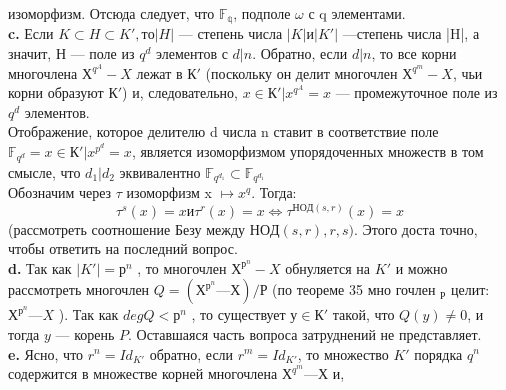 изоморфизм. Отсюда следует, что $\mathbb{F_q}$, подполе $\omega$ с q элементами.\\
\hspace*{15pt}\textbf{c.} Если $K \subset H \subset K', то |H|$ --- степень числа $|K| и |K'|$ ---степень\linebreak
числа |H|, а значит, Н — поле из $q^{d}$ элементов с $d | n$. Обратно, если\linebreak
$d | n$, то все корни многочлена $Х^{q^{A}} - X$ лежат в $К'$ (поскольку он\linebreak
делит многочлен $Х^{q^{m}} - X$, чьи корни образуют $К'$) и, следовательно,\linebreak
${x \in К' | x^{q^{A}} = x}$ --- промежуточное поле из $q^d$ элементов.\\
\hspace*{0pt} Отображение, которое делителю d числа n ставит в соответствие
поле $\mathbb{F}_{q^{d}} = {x \in К' | x^{p^{d}}  = x}$, является изоморфизмом упорядоченных\linebreak
множеств в том смысле, что $d_1 | d_2$ эквивалентно $\mathbb{F}_{q^{d_1}} \subset \mathbb{F}_{q^{d_1}}$\\
\hspace*{15pt}Обозначим через $\tau$ изоморфизм x $\mapsto x^{q}$. Тогда:
$$\tau^{s}(x) = x и \tau^{r}(x) = x \Longleftrightarrow \tau^{НОД(s, r)}(x) = x$$
(рассмотреть соотношение Безу между $НОД(s,r), r, s)$. Этого доста­\linebreak
точно, чтобы ответить на последний вопрос.\\
\hspace*{15pt}\textbf{d.} Так как $|K'| = р^{n}$ , то многочлен $Х^{р^n} - X$ обнуляется на $K'$ и\linebreak
можно рассмотреть многочлен $Q = (Х^{р^{n}} — Х )/Р$ (по теореме 35 мно­\linebreak
гочлен $_Р$ целит: $Х^{р^{n}} — X$ ). Так как $degQ < р^{n}$ , то существует $у \in К'$\linebreak
такой, что $Q(y) \neq 0$, и тогда $y$ — корень $P$. Оставшаяся часть вопроса \linebreak
затруднений не представляет.\\
\hspace*{15pt}\textbf{e.} Ясно, что $r^{n} = Id_{K'}$ обратно, если $r^{m} = Id_{K'}$, то множество\linebreak
$K'$ порядка $q^{n}$ содержится в множестве корней многочлена $Х^{q^{m}} — Х$ и,\linebreak

